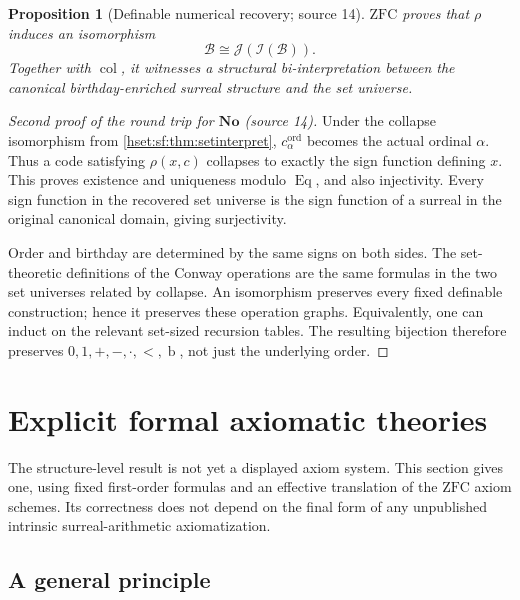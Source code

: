 \documentclass[11pt,letterpaper]{article}
\newtheorem{proposition}[proposition]{Proposition}\aliascntresetthe{proposition}
\theoremstyle{definition}
\theoremstyle{remark}
\newcommand{\No}{\mathbf{No}}
\newcommand{\bd}{\operatorname{b}}
\newcommand{\B}{\mathcal B}
\newcommand{\I}{\mathcal I}
\newcommand{\J}{\mathcal J}
\newcommand{\ZFC}{\mathrm{ZFC}}
\newcommand{\Eqc}{\operatorname{Eq}}
\begin{document}
\begin{proposition}[Definable numerical recovery; source 14]\label{hset:sf:prop:recovery}
$\ZFC$ proves that $\rho$ induces an isomorphism
\[
 \B\cong\J(\I(\B)).
\]
Together with $\operatorname{col}$, it witnesses a structural bi-interpretation
between the canonical birthday-enriched surreal structure and the set universe.
\end{proposition}
\begin{proof}[Second proof of the round trip for $\No$ (source 14)]
Under the collapse isomorphism from \cref{hset:sf:thm:setinterpret},
$c^{\mathrm{ord}}_\alpha$ becomes the actual ordinal $\alpha$. Thus a code
satisfying $\rho(x,c)$ collapses to exactly the sign function defining $x$. This
proves existence and uniqueness modulo $\Eqc$, and also injectivity. Every sign
function in the recovered set universe is the sign function of a surreal in the
original canonical domain, giving surjectivity.

Order and birthday are determined by the same signs on both sides. The
set-theoretic definitions of the Conway operations are the same formulas in the
two set universes related by collapse. An isomorphism preserves every fixed
definable construction; hence it preserves these operation graphs. Equivalently,
one can induct on the relevant set-sized recursion tables. The resulting
bijection therefore preserves $0,1,+,-,\cdot,<,\bd$, not just the underlying order.
\end{proof}

\section{Explicit formal axiomatic theories}
\label{hset:sf:sec:axioms}

The structure-level result is not yet a displayed axiom system. This section gives
one, using fixed first-order formulas and an effective translation of the $\ZFC$
axiom schemes. Its correctness does not depend on the final form of any
unpublished intrinsic surreal-arithmetic axiomatization.

\subsection{A general principle}
\end{document}
